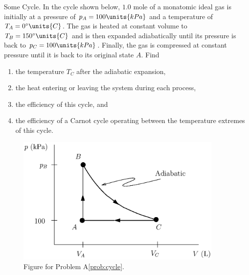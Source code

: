 \begin{aproblem}{Some Cycle.} 
  In the cycle shown below, $1.0$ mole of a
  monatomic ideal gas is initially at a pressure of $p_A=100\units{kPa}$
  and a temperature of $T_A=0^\circ\units{C}$.  The gas is heated at
  constant volume to $T_B = 150^\circ\units{C}$ and is then expanded
  adiabatically until its pressure is back to $p_C=100\units{kPa}$.
  Finally, the gas is compressed at constant pressure until it is back
  to its original state $A$.  Find

  \begin{enumerate}
  \item the temperature $T_C$ after the adiabatic expansion,
  \item the heat entering or leaving the system during each process,
  \item the efficiency of this cycle, and
  \item the efficiency of a Carnot cycle operating between the
    temperature extremes of this cycle.
  \end{enumerate}
  \begin{figure}[h]
    \begin{center}
      \includegraphics[width=4in]{additional_problems/cycle.eps}
    \end{center}
    \caption{Figure for Problem A\ref{prob:cycle}.}
    \label{fig:cycle}
  \end{figure}
  \label{prob:cycle}
\end{aproblem}



